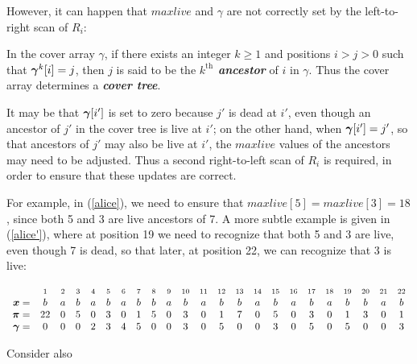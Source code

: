 \documentclass[runningheads,a4paper]{llncs}
\def\s#1{\mbox{\boldmath $#1$}}
\def\itbf#1{\textit{\textbf{#1}}}
\begin{document}
However, it can happen that $maxlive$ and \s{\gamma} are not correctly set
by the left-to-right scan of $R_i$:

\begin{definition}[\cite{LS02}]
\label{defn-ancestor}
In the cover array \s{\gamma},
if there exists an integer $k \ge 1$ and positions $i > j > 0$
such that $\s{\gamma}^k[i] = j$,
then $j$ is said to be the \itbf{$k^{\mbox{th}}$ ancestor} of $i$ in \s{\gamma}.
Thus the cover array determines a \itbf{cover tree}.
\end{definition}

It may be that $\s{\gamma}[i']$ is set to zero because $j'$ is dead at $i'$,
even though an ancestor of $j'$ in the cover tree is live at $i'$;
on the other hand, when $\s{\gamma}[i'] = j'$,
so that ancestors of $j'$ may also be live at $i'$,
the $maxlive$ values of the ancestors may need to be adjusted.
Thus a second right-to-left scan of $R_i$ is required,
in order to ensure that these updates are correct.

For example, in (\ref{alice}),
we need to ensure that $maxlive[5] = maxlive[3] = 18$,
since both 5 and 3 are live ancestors of 7.
A more subtle example is given in (\ref{alice'}),
where at position 19 we need to recognize that both 5 and 3 are live,
even though 7 is dead,
so that later, at position 22, we can recognize that 3 is live:

\begin{equation}
\begin{array}{rccccccccccccccccccccccc}
& \scriptstyle 1 & \scriptstyle 2 & \scriptstyle 3 & \scriptstyle 4 &
\scriptstyle 5 & \scriptstyle 6 & \scriptstyle 7 & \scriptstyle 8 & \scriptstyle 9 & \scriptstyle 10 & \scriptstyle 11 & \scriptstyle 12 & \scriptstyle 13 & \scriptstyle 14 & \scriptstyle 15 & \scriptstyle 16 & \scriptstyle 17 & \scriptstyle 18 & \scriptstyle 19 & \scriptstyle 20 & \scriptstyle 21 & \scriptstyle 22 \\
\s{x} = & b & a & b & a & b & a & b & b & a & b & a & b & b & a & b & a & b
& a & b & b & a & b \label{alice'} \\
\s{\pi} = & 22 & 0 & 5 & 0 & 3 & 0 & 1 & 5 & 0 & 3 & 0 & 1 & 7 & 0 & 5 & 0
& 3 & 0 & 1 & 3 & 0 & 1 \\
\s{\gamma} = & 0 & 0 & 0 & 2 & 3 & 4 & 5 & 0 & 0 & 3 & 0 & 5 & 0 & 0 & 3 &
0 & 5 & 0 & 5 & 0 & 0 & 3\\
\end{array}
\end{equation} 

Consider also
\end{document}
